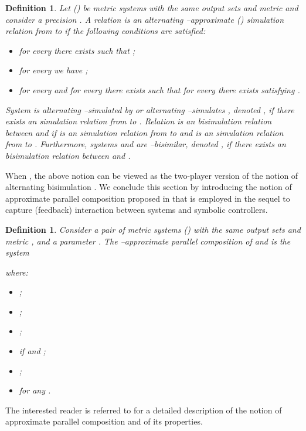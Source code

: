 \documentclass{amsart}
\newtheorem{definition}[theorem]{Definition}
\begin{document}
\begin{definition}
\label{ASR_S} 
\cite{PolaSIAM2009,paulo}
Let   () be metric systems with the same output sets  and metric  and consider a precision . A relation  is an alternating --approximate () simulation relation from  to  if the following conditions are satisfied:
\begin{itemize}
\item[(i)] for every  there exists  such that
;
\item[(ii)]  for every  we have ;
\item[(iii)] for every  and for every  there exists  such that for every  there exists  satisfying .
\end{itemize}
System  is alternating --simulated by  or  alternating --simulates , denoted \mbox{}, if there exists an  simulation relation from  to . 
Relation  is an  bisimulation relation between  and  if  is an  simulation relation from  to  and  is an  simulation relation from  to . Furthermore, systems  and  are --bisimilar, denoted \mbox{}, if there exists an  bisimulation relation  between  and .
\end{definition}

When , the above notion can be viewed as the two-player version of the notion of alternating bisimulation \cite{alternating}. 
We conclude this section by introducing the notion of approximate parallel composition proposed in \cite{TabuadaTAC08} that is employed in the sequel to capture (feedback) interaction between systems and symbolic controllers. 

\begin{definition}
\cite{TabuadaTAC08}
\label{composition} 
Consider a pair of metric systems \mbox{} () with the same output sets  and metric , and a parameter . The --approximate parallel composition of  and  is the system

where:
\begin{itemize}
\item ;
\item ;
\item ;
\item  if  and ;
\item ;
\item  for any .
\end{itemize}
\end{definition}

The interested reader is referred to \cite{TabuadaTAC08,paulo} for a detailed description of the notion of approximate parallel composition and of its properties.
\end{document}
